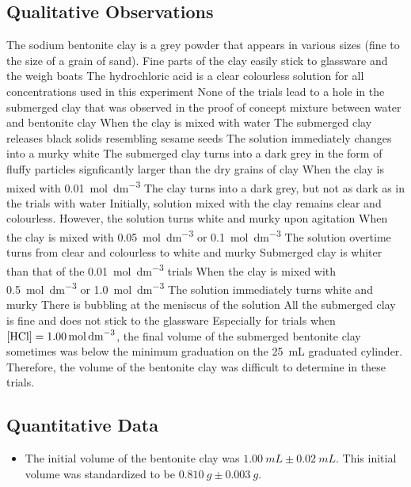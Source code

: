 \documentclass[11pt, letterpaper]{article}
\begin{document}
\subsection{Qualitative Observations}
\begin{outline}
    \1 The sodium bentonite clay is a grey powder that appears in various sizes (fine to the size of a grain of sand). Fine parts of the clay easily stick to glassware and the weigh boats
    \1 The hydrochloric acid is a clear colourless solution for all \ce{[H+]} concentrations used in this experiment
    \1 None of the trials lead to a hole in the submerged clay that was observed in the proof of concept mixture between water and bentonite clay
    \1 When the clay is mixed with water
    \2 The submerged clay releases black solids resembling sesame seeds
    \2 The solution immediately changes into a murky white
    \2 The submerged clay turns into a dark grey in the form of fluffy particles signficantly larger than the dry grains of clay
    \1 When the clay is mixed with \SI{0.01}{mol.dm^{-3}} 
    \2 The clay turns into a dark grey, but not as dark as in the trials with water
    \2 Initially, solution mixed with the clay remains clear and colourless. However, the solution turns white and murky upon agitation
    \1 When the clay is mixed with \SI{0.05}{mol.dm^{-3}}  or \SI{0.1}{mol.dm^{-3}} 
    \2 The solution overtime turns from clear and colourless to white and murky
    \2 Submerged clay is whiter than that of the \SI{0.01}{mol.dm^{-3}} trials
    \1 When the clay is mixed with \SI{0.5}{mol.dm^{-3}}  or \SI{1.0}{mol.dm^{-3}} 
    \2 The solution immediately turns white and murky
    \2 There is bubbling at the meniscus of the solution
    \2 All the submerged clay is fine and does not stick to the glassware
    \1 Especially for trials when \(\ce{[HCl]} = \SI{1.00}{mol.dm^{-3}}\), the final volume of the submerged bentonite clay sometimes was below the minimum graduation on the \SI{25}{mL} graduated cylinder. Therefore, the volume of the bentonite clay was difficult to determine in these trials.
\end{outline}

\subsection{Quantitative Data}

\begin{itemize}
    \item The initial volume of the bentonite clay was \(\SI{1.00}{mL} \pm \SI{0.02}{mL}\). This initial volume was standardized to be \(\SI{0.810}{g} \pm \SI{0.003}{g}\).
\end{itemize}
\end{document}
